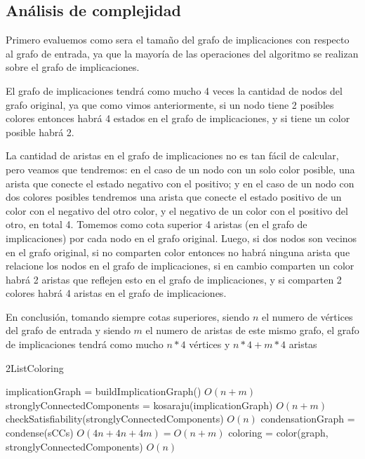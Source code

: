 \documentclass{article}
\theoremstyle{definition}
\theoremstyle{remark}
\begin{document}
\subsection{Análisis de complejidad}
Primero evaluemos como sera el tamaño del grafo de implicaciones con respecto al grafo de entrada, ya que la mayoría de las operaciones del algoritmo se realizan sobre el grafo de implicaciones.

El grafo de implicaciones tendrá como mucho 4 veces la cantidad de nodos del grafo original, ya que como vimos anteriormente, si un nodo tiene 2 posibles colores entonces habrá 4 estados en el grafo de implicaciones, y si tiene un color posible habrá 2.

La cantidad de aristas en el grafo de implicaciones no es tan fácil de calcular, pero veamos que tendremos: en el caso de un nodo con un solo color posible, una arista que conecte el estado negativo con el positivo; y en el caso de un nodo con dos colores posibles tendremos una arista que conecte el estado positivo de un color con el negativo del otro color, y el negativo de un color con el positivo del otro, en total 4. Tomemos como cota superior 4 aristas (en el grafo de implicaciones) por cada nodo en el grafo original.
Luego, si dos nodos son vecinos en el grafo original, si no comparten color entonces no habrá ninguna arista que relacione los nodos en el grafo de implicaciones, si en cambio comparten un color habrá 2 aristas que reflejen esto en el grafo de implicaciones, y si comparten 2 colores habrá 4 aristas en el grafo de implicaciones.

En conclusión, tomando siempre cotas superiores, siendo $n$ el numero de vértices del grafo de entrada y siendo $m$ el numero de aristas de este mismo grafo, el grafo de implicaciones tendrá como mucho $n*4$ vértices y $n*4+m*4$ aristas

\begin{algorithm}
\caption{2ListColoring}
\label{ex1:pseudo1}

\begin{algorithmic}
\State implicationGraph = buildImplicationGraph() \Comment $O(n+m)$
\State stronglyConnectedComponents = kosaraju(implicationGraph) \Comment $O(n+m)$
\State checkSatisfiability(stronglyConnectedComponents) \Comment $O(n)$
\State condensationGraph = condense(sCCs) \Comment $O(4n+4n+4m) = O(n+m)$
\State coloring = color(graph, stronglyConnectedComponents) \Comment  $O(n)$
\EndFunction
\end{algorithmic}
\end{algorithm}
\end{document}
